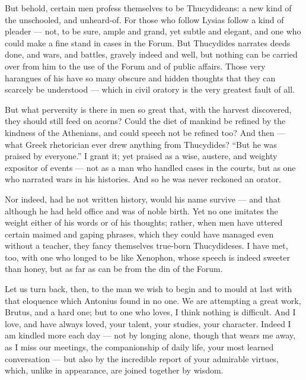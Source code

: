  But behold, certain men profess themselves to be Thucydideans: a new kind of the unschooled, and unheard-of. For those who follow Lysias follow a kind of pleader — not, to be sure, ample and grand, yet subtle and elegant, and one who could make a fine stand in cases in the Forum. But Thucydides narrates deeds done, and wars, and battles, gravely indeed and well, but nothing can be carried over from him to the use of the Forum and of public affairs. Those very harangues of his have so many obscure and hidden thoughts that they can scarcely be understood — which in civil oratory is the very greatest fault of all.

 But what perversity is there in men so great that, with the harvest discovered, they should still feed on acorns? Could the diet of mankind be refined by the kindness of the Athenians, and could speech not be refined too? And then — what Greek rhetorician ever drew anything from Thucydides? ``But he was praised by everyone.'' I grant it; yet praised as a wise, austere, and weighty expositor of events — not as a man who handled cases in the courts, but as one who narrated wars in his histories. And so he was never reckoned an orator.

 Nor indeed, had he not written history, would his name survive — and that although he had held office and was of noble birth. Yet no one imitates the weight either of his words or of his thoughts; rather, when men have uttered certain maimed and gaping phrases, which they could have managed even without a teacher, they fancy themselves true-born Thucydideses. I have met, too, with one who longed to be like Xenophon, whose speech is indeed sweeter than honey, but as far as can be from the din of the Forum.

 Let us turn back, then, to the man we wish to begin and to mould at last with that eloquence which Antonius found in no one. We are attempting a great work, Brutus, and a hard one; but to one who loves, I think nothing is difficult. And I love, and have always loved, your talent, your studies, your character. Indeed I am kindled more each day — not by longing alone, though that wears me away, as I miss our meetings, the companionship of daily life, your most learned conversation — but also by the incredible report of your admirable virtues, which, unlike in appearance, are joined together by wisdom.

